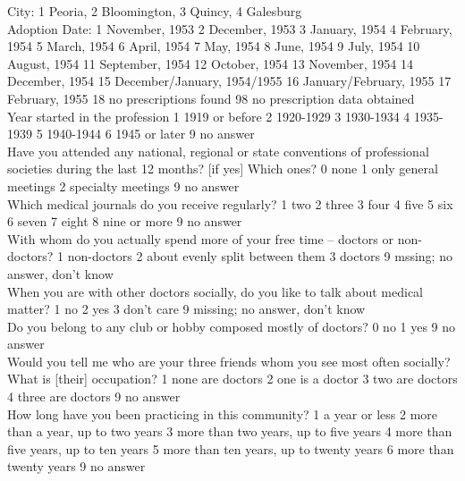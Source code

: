 \documentclass[11pt]{article}
\begin{document}
City: 1	Peoria,	2 Bloomington, 3 Quincy, 4 Galesburg\\

Adoption Date:
1 November, 1953 
2 December, 1953 
3 January, 1954 
4 February, 1954 
5 March, 1954 
6 April, 1954 
7 May, 1954 
8 June, 1954 
9 July, 1954 
10 August, 1954 
11 September, 1954 
12 October, 1954 
13 November, 1954 
14 December, 1954 
15 December/January, 1954/1955 
16 January/February, 1955 
17 February, 1955 
18 no prescriptions found 
98 no prescription data obtained\\

Year started in the profession
1	1919 or before 
2 1920-1929 
3	1930-1934 
4	1935-1939 
5	1940-1944 
6	1945 or later 
9	no answer\\

Have you attended any national, regional or state conventions of professional societies during the last 12 months? [if yes] Which ones? 
0 none 
1 only general meetings 
2 specialty meetings 
9 no answer\\

Which medical journals do you receive regularly? 
1 two 
2 three 
3 four 
4 five 
5 six 
6 seven 
7 eight 
8 nine or more
9 no answer\\

With whom do you actually spend more of your free time -- doctors or non-doctors? 
1 non-doctors 
2 about evenly split between them 
3 doctors 
9 mssing; no answer, don't know\\

When you are with other doctors socially, do you like to talk about medical matter? 
1 no 
2 yes 
3 don't care 
9 missing; no answer, don't know\\

Do you belong to any club or hobby composed mostly of doctors? 
0 no 
1 yes 
9 no answer\\

Would you tell me who are your three friends whom you see most often socially? What is [their] occupation?
1 none are doctors 
2 one is a doctor 
3 two are doctors 
4 three are doctors 
9 no answer\\

How long have you been practicing in this community? 
1 a year or less 
2 more than a year, up to two years 
3 more than two years, up to five years 
4 more than five years, up to ten years 
5 more than ten years, up to twenty years 
6 more than twenty years 
9 no answer\\
\end{document}
